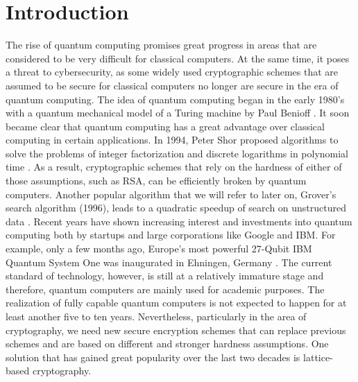 \documentclass[
  a4paper,  %
  twoside,  %
  bibliography=totoc,
  headsepline,
  cleardoublepage=empty,
  parskip=half,
  draft=false
]{scrbook}
\begin{document}
\chapter{Introduction}\label{sec:intro}
The rise of quantum computing promises great progress in areas that are considered to be very difficult for classical computers. At the same time, it poses a threat to cybersecurity, as some widely used cryptographic schemes that are assumed to be secure for classical computers no longer are secure in the era of quantum computing. The idea of quantum computing began in the early 1980's with a quantum mechanical model of a Turing machine by Paul Benioff \cite{benioff1980computer}. It soon became clear that quantum computing has a great advantage over classical computing in certain applications. In 1994, Peter Shor proposed algorithms to solve the problems of integer factorization and discrete logarithms in polynomial time \cite{Shor97}. As a result, cryptographic schemes that rely on the hardness of either of those assumptions, such as RSA, can be efficiently broken by quantum computers. Another popular algorithm that we will refer to later on, Grover's search algorithm (1996), leads to a quadratic speedup of search on unstructured data \cite{Gro96}.
Recent years have shown increasing interest and investments into quantum computing both by startups and large corporations like Google and IBM. For example, only a few months ago, Europe's most powerful 27-Qubit IBM Quantum System One was inaugurated in Ehningen, Germany \cite{IBM}. The current standard of technology, however, is still at a relatively immature stage and therefore, quantum computers are mainly used for academic purposes. The realization of fully capable quantum computers is not expected to happen for at least another five to ten years.
Nevertheless, particularly in the area of cryptography, we need new secure encryption schemes that can replace previous schemes and are based on different and stronger hardness assumptions. One solution that has gained great popularity over the last two decades is lattice-based cryptography.
\end{document}

